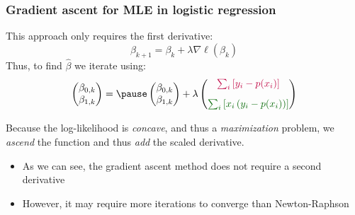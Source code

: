\documentclass[smaller]{beamer}
\newcommand{\lt}{\left}
\newcommand{\rt}{\right}
\newcommand{\?}{\stackrel{?}{=}}
\newcommand{\rd}{\color{red}}
\newcommand{\bl}{\color{blue}}
\newcommand{\pl}{\color{purple}}
\newcommand{\gr}{\color{green!40!black}}
\begin{document}
\begin{frame}
  \frametitle{Gradient ascent for MLE in logistic regression}
  \pause

  This approach only requires the first derivative:\pause
  \begin{equation}
    \label{eq:24}
    \beta_{k+1} = \beta_k + \lambda\nabla\ell(\beta_k)
  \end{equation}\pause
  Thus, to find $\hat\beta$ we iterate using:
  \pause
  \begin{equation}
    \label{eq:25}
    \begin{pmatrix}
      \beta_{0,k} \\ \beta_{1,k}
    \end{pmatrix}
    = \pause
    \begin{pmatrix}
      \beta_{0,k} \\ \beta_{1,k}
    \end{pmatrix}
    + \lambda
    \begin{pmatrix}
      \pl \sum_i \lt[y_i - p(x_i) \rt]\\[3mm]
      \gr \sum_i \lt[ x_i\lt(y_i - p(x_i)\rt)\rt] 
    \end{pmatrix}
  \end{equation}\pause
  
  Because the log-likelihood is \textit{\bl concave}, and thus a \textit{\bl maximization} problem,
  we \textit{\bl ascend} the function and thus
  \textit{\bl add} the scaled derivative.\pause

  
  \begin{itemize}[<+->]\rd
  \item As we can see, the gradient ascent method does not require a second derivative
  \item However, it may require more iterations to converge than Newton-Raphson
  \end{itemize}
  
\end{frame}
\end{document}
